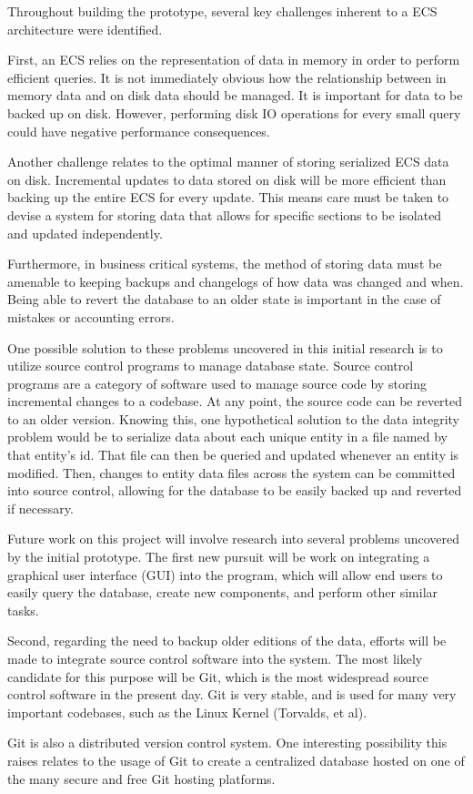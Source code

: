 \documentclass[conference]{IEEEtran}
\begin{document}
\begin {Current Findings}
Throughout building the prototype, several key challenges inherent to a ECS architecture were identified. 

First, an ECS relies on the representation of data in memory in order to perform efficient queries. It is not immediately obvious how the relationship between in memory data and on disk data should be managed. It is important for data to be backed up on disk. However, performing disk IO operations for every small query could have negative performance consequences. 

Another challenge relates to the optimal manner of storing serialized ECS data on disk. Incremental updates to data stored on disk will be more efficient than backing up the entire ECS for every update. This means care must be taken to devise a system for storing data that allows for specific sections to be isolated and updated independently. 

Furthermore, in business critical systems, the method of storing data must be amenable to keeping backups and changelogs of how data was changed and when. Being able to revert the database to an older state is important in the case of mistakes or accounting errors. 

One possible solution to these problems uncovered in this initial research is to utilize source control programs to manage database state. Source control programs are a category of software used to manage source code by storing incremental changes to a codebase. At any point, the source code can be reverted to an older version. Knowing this, one hypothetical solution to the data integrity problem would be to serialize data about each unique entity in a file named by that entity’s id. That file can then be queried and updated whenever an entity is modified. Then, changes to entity data files across the system can be committed into source control, allowing for the database to be easily backed up and reverted if necessary. 
\end {Current Findings}

\begin {Future Work}
Future work on this project will involve research into several problems uncovered by the initial prototype. The first new pursuit will be work on integrating a graphical user interface (GUI) into the program, which will allow end users to easily query the database, create new components, and perform other similar tasks.

Second, regarding the need to backup older editions of the data, efforts will be made to integrate source control software into the system. The most likely candidate for this purpose will be Git, which is the most widespread source control software in the present day. Git is very stable, and is used for many very important codebases, such as the Linux Kernel (Torvalds, et al). 

Git is also a distributed version control system. One interesting possibility this raises relates to the usage of Git to create a centralized database hosted on one of the many secure and free Git hosting platforms. 
\end {Future Work}
\end{document}
